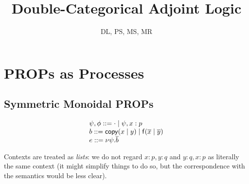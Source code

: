 \documentclass{article}
\begin{document}
\title{Double-Categorical Adjoint Logic}
\author{DL, PS, MS, MR}




\maketitle

\section{PROPs as Processes}

\subsection{Symmetric Monoidal PROPs}

\newcommand\const[3]{\ensuremath{\dsd{#1}(#2 \mid #3)}}
\newcommand\cpy[2]{\ensuremath{\dsd{copy}(#1 \mid #2)}}
\newcommand\cut[2]{\ensuremath{\nu #1.#2}}
\newcommand\lst[1]{\ensuremath{\overline{#1}}}
\newcommand\bfunc[2]{\ensuremath{#1 \bullet #2}}
\newcommand\idp[1]{\ensuremath{1_{#1}}}

\[
\begin{array}{l}
\psi,\phi ::= \cdot \mid \psi, x:p\\
b ::= \cpy{x}{y} \mid \const{f}{\lst{x}}{\lst{y}}\\
e ::= \cut{\psi}{\lst{b}}
\end{array}
\]

Contexts are treated as \emph{lists}: we do not regard $x:p,y:q$ and
$y:q,x:p$ as literally the same context (it might simplify things to do
so, but the correspondence with the semantics would be less clear).  
\end{document}
